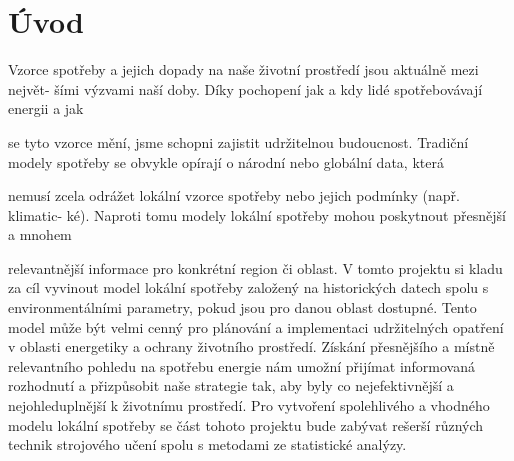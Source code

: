 \documentclass[FM,BP,fonts]{tulthesis}
\begin{document}
\chapter{Úvod}

Vzorce spotřeby a jejich dopady na naše životní prostředí jsou aktuálně mezi největ-
šími výzvami naší doby. Díky pochopení jak a kdy lidé spotřebovávají energii a jak

se tyto vzorce mění, jsme schopni zajistit udržitelnou budoucnost.
Tradiční modely spotřeby se obvykle opírají o národní nebo globální data, která

nemusí zcela odrážet lokální vzorce spotřeby nebo jejich podmínky (např. klimatic-
ké). Naproti tomu modely lokální spotřeby mohou poskytnout přesnější a mnohem

relevantnější informace pro konkrétní region či oblast.
V tomto projektu si kladu za cíl vyvinout model lokální spotřeby založený na
historických datech spolu s environmentálními parametry, pokud jsou pro danou
oblast dostupné. Tento model může být velmi cenný pro plánování a implementaci
udržitelných opatření v oblasti energetiky a ochrany životního prostředí. Získání
přesnějšího a místně relevantního pohledu na spotřebu energie nám umožní přijímat
informovaná rozhodnutí a přizpůsobit naše strategie tak, aby byly co nejefektivnější
a nejohleduplnější k životnímu prostředí.
Pro vytvoření spolehlivého a vhodného modelu lokální spotřeby se část tohoto
projektu bude zabývat rešerší různých technik strojového učení spolu s metodami
ze statistické analýzy.
\end{document}
